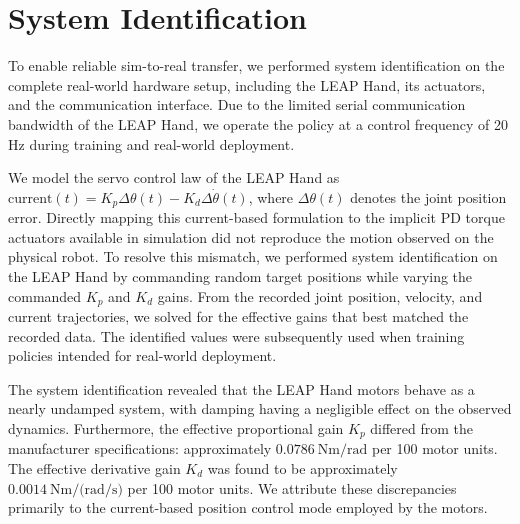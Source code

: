 \section{System Identification}
\label{appendix:sys_ID}

To enable reliable sim-to-real transfer, we performed system identification on the complete real-world hardware setup, including the LEAP Hand, its actuators, and the communication interface. Due to the limited serial communication bandwidth of the LEAP Hand, we operate the policy at a control frequency of 20 Hz during training and real-world deployment.


We model the servo control law of the LEAP Hand as $\text{current}(t) = K_p \Delta\theta(t) - K_d \Delta\dot{\theta}(t)$, where $\Delta\theta(t)$ denotes the joint position error. Directly mapping this current-based formulation to the implicit PD torque actuators available in simulation did not reproduce the motion observed on the physical robot. To resolve this mismatch, we performed system identification on the LEAP Hand by commanding random target positions while varying the commanded $K_p$ and $K_d$ gains. From the recorded joint position, velocity, and current trajectories, we solved for the effective gains that best matched the recorded data. The identified values were subsequently used when training policies intended for real-world deployment.

The system identification revealed that the LEAP Hand motors behave as a nearly undamped system, with damping having a negligible effect on the observed dynamics. Furthermore, the effective proportional gain $K_p$ differed from the manufacturer specifications: approximately $0.0786~\text{Nm/rad}$ per 100 motor units. The effective derivative gain $K_d$ was found to be approximately $0.0014~\text{Nm/(rad/s)}$ per 100 motor units. We attribute these discrepancies primarily to the current-based position control mode employed by the motors.

